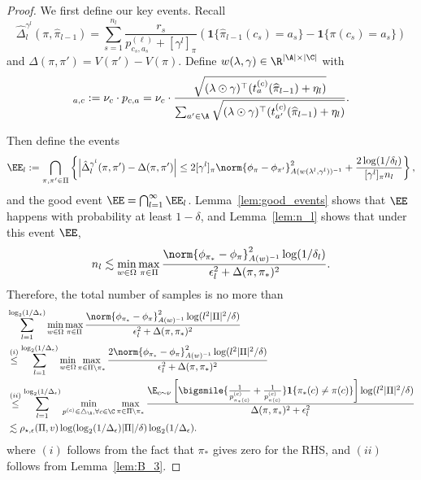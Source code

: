\documentclass{article}
\newcommand{\lalit}[1]{\textcolor{blue}{}}
\newcommand{\pill}{\widehat{\pi}_{l-1}}
\newcommand{\1}{\mathbf{1}}
\begin{document}
\begin{proof}
We first define our key events. Recall
$$\hat{\Delta}_l^{\gamma^l}(\pi,\pill)=\sum_{s=1}^{n_l}\frac{r_s}{p^{(\ell)}_{c_s,a_s}+[\gamma^l]_\pi}(\1\{\pill(c_s)=a_s\}-\1\{\pi(c_s)=a_s\})$$ and $\Delta(\pi,\pi')=V(\pi')-V(\pi)$. 
Define $w(\lambda,\gamma)\in\R^{|\A|\times|\C|}$ with
\begin{equation*}
    [w(\lambda,\gamma)]_{a, c}:=\nu_{c} \cdot p_{c,a}=\nu_{c} \cdot \frac{\sqrt{(\lambda\odot\gamma)^{\top} (t_{a}^{(c)}(\pill)+\eta_l)}}{\sum_{a'\in \A} \sqrt{(\lambda\odot\gamma)^{\top} (t_{a^{\prime}}^{(c)}(\pill)+\eta_l)}}.
\end{equation*}

Then define the events \[\EE_{l}:=\bigcap_{\pi,\pi'\in\Pi}\left\{\left|\hat{\Delta}_{l}^{\gamma^l}(\pi,\pi')-\Delta(\pi,\pi')\right|\leq 2[\gamma^l]_\pi\norm{\phi_{\pi}-\phi_{\pi'}}_{A(w(\lambda^{l},\gamma^l))^{-1}}^2+\frac{2\log(1/\delta_l)}{[\gamma^l]_\pi n_l}\right\},\]
and the good event $\EE=\bigcap_{l=1}^\infty\EE_l$. Lemma~\ref{lem:good_events} shows that $\EE$ happens with probability at least $1-\delta$, and Lemma~\ref{lem:n_l} shows that under this event $\EE$, $$n_l\lesssim \min_{w\in\Omega}\max_{\pi\in\Pi}\frac{\norm{\phi_{\pi_*}-\phi_\pi}_{A(w)^{-1}}^2\log(1/\delta_l)}{\epsilon_l^2+\Delta(\pi,\pi_*)^2}.$$
Therefore, the total number of samples is no more than 
\begin{align*}
    &\sum_{l=1}^{\log_2(1/\Delta_\epsilon)}\min_{w\in\Omega}\max_{\pi\in\Pi}\frac{\norm{\phi_{\pi_*}-\phi_\pi}_{A(w)^{-1}}^2\log(l^2|\Pi|^2/\delta)}{\epsilon_l^2+\Delta(\pi,\pi_*)^2}\\
    &\overset{(i)}{\leq} \sum_{l=1}^{\log_2(1/\Delta_\epsilon)}\min_{w\in\Omega}\max_{\pi\in\Pi\setminus\pi_*}\frac{2\norm{\phi_{\pi_*}-\phi_\pi}_{A(w)^{-1}}^2\log(l^2|\Pi|^2/\delta)}{\epsilon_l^2+\Delta(\pi,\pi_*)^2}\\
    &\overset{(ii)}{\leq} \sum_{l=1}^{\log_2(1/\Delta_\epsilon)}\min_{p^{(c)}\in\triangle_\A,\forall c\in\C}\max_{\pi\in\Pi\setminus\pi_*}\frac{\E_{c\sim\nu}\left[\bigsmile{\frac{1}{p_{\pi_*(c)}^{(c)}}+\frac{1}{p_{\pi(c)}^{(c)}}}\1\{\pi_*(c)\ne\pi(c)\}\right]\log(l^2|\Pi|^2/\delta)}{\Delta(\pi,\pi_*)^2+\epsilon_l^2}\\
    &\lesssim \rho_{\star,\epsilon}(\Pi, v)\log(\log_2(1/\Delta_\epsilon)|\Pi|/\delta)\log_2(1/\Delta_\epsilon).
\end{align*}
where $(i)$ follows from the fact that $\pi_*$ gives zero for the RHS, and $(ii)$ follows from Lemma~\ref{lem:B_3}.
\end{proof}
\end{document}
